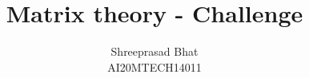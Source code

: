 \documentclass[journal,12pt,twocolumn]{IEEEtran}
\begin{document}
\makeatletter
{}
\makeatother
\let\StandardTheFigure\thefigure
\let\vec\mathbf
\renewcommand{\thefigure}{\theproblem}
\def\putbox#1#2#3{\makebox[0in][l]{\makebox[#1][l]{}\raisebox{\baselineskip}[0in][0in]{\raisebox{#2}[0in][0in]{#3}}}}
     \def\rightbox#1{\makebox[0in][r]{#1}}
     \def\centbox#1{\makebox[0in]{#1}}
     \def\topbox#1{\raisebox{-\baselineskip}[0in][0in]{#1}}
     \def\midbox#1{\raisebox{-0.5\baselineskip}[0in][0in]{#1}}
\vspace{3cm}
\title{Matrix theory - Challenge}
\author{Shreeprasad Bhat\\AI20MTECH14011}
%
%
%
% 
%
\end{document}
